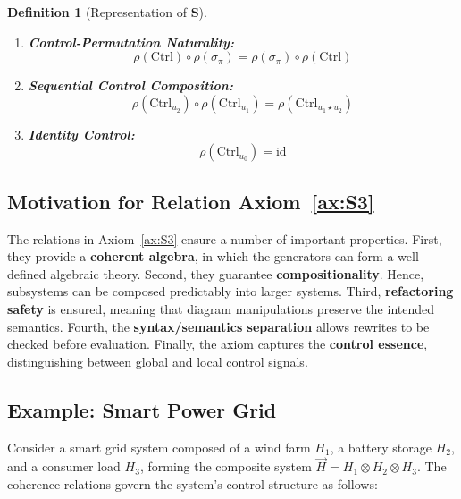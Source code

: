\documentclass[11pt]{article}
\newtheorem{definition}{Definition}
\begin{document}
\begin{definition}[Representation of $\mathbf{S}$]
\begin{enumerate}[label=(SC\arabic*)]
    \item \textbf{Control-Permutation Naturality:}
    \[
    \rho(\mathrm{Ctrl}) \circ \rho(\sigma_{\pi}) = \rho(\sigma_{\pi}) \circ \rho(\mathrm{Ctrl})
    \]
    
    \item \textbf{Sequential Control Composition:}
    \[
    \rho(\mathrm{Ctrl}_{u_2}) \circ \rho(\mathrm{Ctrl}_{u_1}) = \rho(\mathrm{Ctrl}_{u_1 \star u_2})
    \]
    
    \item \textbf{Identity Control:}
    \[
    \rho(\mathrm{Ctrl}_{u_0}) = \mathrm{id}
    \]
\end{enumerate}
\end{definition}

\subsection*{Motivation for Relation Axiom~\ref{ax:S3}}

The relations in Axiom~\ref{ax:S3} ensure a number of important properties. First, they provide a \textbf{coherent algebra}, in which the generators can form a well-defined algebraic theory. Second, they guarantee \textbf{compositionality}. Hence, subsystems can be composed predictably into larger systems. Third, \textbf{refactoring safety} is ensured, meaning that diagram manipulations preserve the intended semantics. Fourth, the \textbf{syntax/semantics separation} allows rewrites to be checked before evaluation. Finally, the axiom captures the \textbf{control essence}, distinguishing between global and local control signals.



\subsection*{Example: Smart Power Grid}
Consider a smart grid system composed of a wind farm $H_1$, a battery storage $H_2$, and a consumer load $H_3$, forming the composite system $\vec{H} = H_1 \otimes H_2 \otimes H_3$. The coherence relations govern the system's control structure as follows:
\end{document}
